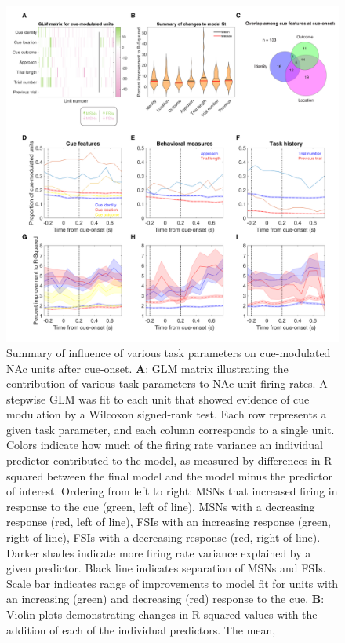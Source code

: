 \documentclass[11pt]{article}
\newcommand{\bsf}[1]{\textbf{#1}}
\begin{document}
 \begin{figure}[ht!]
\centering
\includegraphics[height=0.5\textheight]{Fig 6 - GLM.pdf}
\caption{Summary of influence of various task parameters on cue-modulated NAc
units after cue-onset. \bsf{A}: GLM matrix illustrating the contribution of
various task parameters to NAc unit firing rates. A stepwise GLM was fit to
each unit that showed evidence of cue modulation by a Wilcoxon signed-rank
test. Each row represents a given task parameter, and each column corresponds
to a single unit. Colors indicate how much of the firing rate variance an
individual predictor contributed to the model, as measured by differences in
R-squared between the final model and the model minus the predictor of
interest. Ordering from left to right: MSNs that increased firing in response
to the cue (green, left of line), MSNs with a decreasing response (red, left
of line), FSIs with an increasing response (green, right of line), FSIs with a
decreasing response (red, right of line). Darker shades indicate more firing
rate variance explained by a given predictor. Black line indicates separation
of MSNs and FSIs. Scale bar indicates range of improvements to model fit for units with an increasing (green) and decreasing (red) response to the cue. \bsf{B}: Violin plots demonstrating changes in R-squared
values with the addition of each of the individual predictors. The mean,
}
\end{figure}
\end{document}
